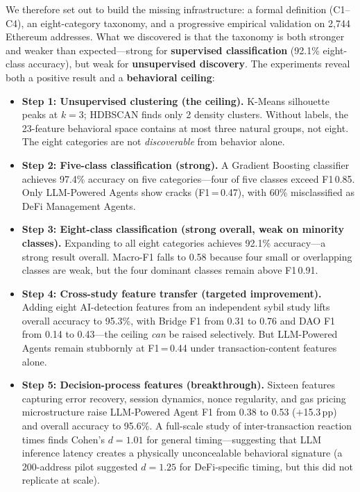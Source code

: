 \documentclass[sigconf,nonacm=false]{acmart}
\begin{document}
We therefore set out to build the missing infrastructure: a formal definition (C1--C4), an eight-category taxonomy, and a progressive empirical validation on 2,744 Ethereum addresses. What we discovered is that the taxonomy is both stronger and weaker than expected---strong for \textbf{supervised classification} (92.1\% eight-class accuracy), but weak for \textbf{unsupervised discovery}. The experiments reveal both a positive result and a \textbf{behavioral ceiling}:

\begin{itemize}
\item \textbf{Step 1: Unsupervised clustering (the ceiling).} K-Means silhouette peaks at $k{=}3$; HDBSCAN finds only 2 density clusters. Without labels, the 23-feature behavioral space contains at most three natural groups, not eight. The eight categories are not \emph{discoverable} from behavior alone.
\item \textbf{Step 2: Five-class classification (strong).} A Gradient Boosting classifier achieves 97.4\% accuracy on five categories---four of five classes exceed F1\,0.85. Only LLM-Powered Agents show cracks (F1\,=\,0.47), with 60\% misclassified as DeFi Management Agents.
\item \textbf{Step 3: Eight-class classification (strong overall, weak on minority classes).} Expanding to all eight categories achieves 92.1\% accuracy---a strong result overall. Macro-F1 falls to 0.58 because four small or overlapping classes are weak, but the four dominant classes remain above F1\,0.91.
\item \textbf{Step 4: Cross-study feature transfer (targeted improvement).} Adding eight AI-detection features from an independent sybil study lifts overall accuracy to 95.3\%, with Bridge F1 from 0.31 to 0.76 and DAO F1 from 0.14 to 0.43---the ceiling \emph{can} be raised selectively. But LLM-Powered Agents remain stubbornly at F1\,=\,0.44 under transaction-content features alone.
\item \textbf{Step 5: Decision-process features (breakthrough).} Sixteen features capturing error recovery, session dynamics, nonce regularity, and gas pricing microstructure raise LLM-Powered Agent F1 from 0.38 to 0.53 ($+$15.3\,pp) and overall accuracy to 95.6\%. A full-scale study of inter-transaction reaction times finds Cohen's $d{=}1.01$ for general timing---suggesting that LLM inference latency creates a physically unconcealable behavioral signature (a 200-address pilot suggested $d{=}1.25$ for DeFi-specific timing, but this did not replicate at scale).
\end{itemize}
\end{document}

